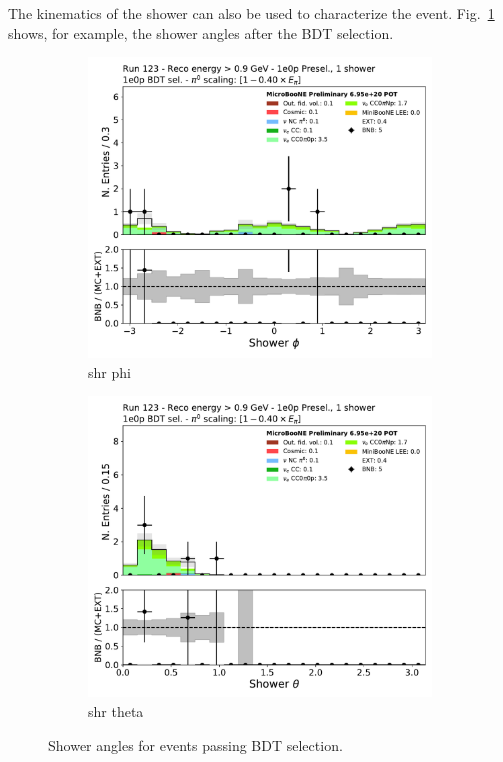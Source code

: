 The kinematics of the shower can also be used to characterize the event.
Fig.~\ref{fig:1e0p:High_E_sideband:shrtheta} shows, for example, the shower angles after the BDT selection.
\begin{figure}[H]
    \centering
    \begin{subfigure}{0.3\textwidth}
    \includegraphics[width=1.0\textwidth]{1e0p/High_E_Sideband/BDT_selection/shr_phi.pdf}
    \caption{shr phi}
    \end{subfigure}
    \begin{subfigure}{0.3\textwidth}
    \includegraphics[width=1.0\textwidth]{1e0p/High_E_Sideband/BDT_selection/shr_theta.pdf}
    \caption{shr theta}
    \end{subfigure}
    \caption{Shower angles for events passing BDT selection.} 
    \label{fig:1e0p:High_E_sideband:shrtheta}
\end{figure}

